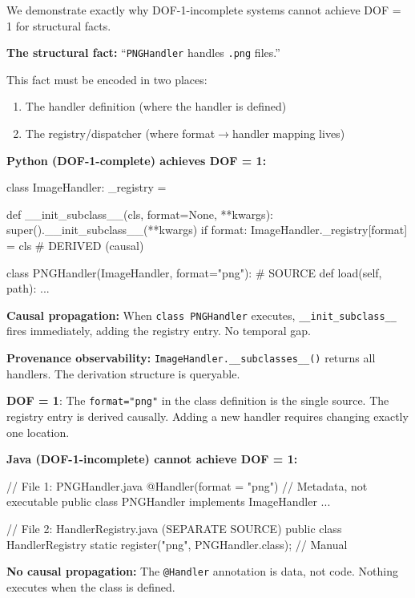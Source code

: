 We demonstrate exactly why DOF-1-incomplete systems cannot achieve DOF = 1 for structural facts.

\textbf{The structural fact:} ``\texttt{PNGHandler} handles \texttt{.png} files.''

This fact must be encoded in two places:
\begin{enumerate}
\tightlist
\item The handler definition (where the handler is defined)
\item The registry/dispatcher (where format$\to$handler mapping lives)
\end{enumerate}

\textbf{Python (DOF-1-complete) achieves DOF = 1:}

\begin{code}
class ImageHandler:
    _registry = {}

    def __init_subclass__(cls, format=None, **kwargs):
        super().__init_subclass__(**kwargs)
        if format:
            ImageHandler._registry[format] = cls  # DERIVED (causal)

class PNGHandler(ImageHandler, format="png"):  # SOURCE
    def load(self, path): ...
\end{code}

\textbf{Causal propagation:} When \texttt{class PNGHandler} executes, \texttt{\_\_init\_subclass\_\_} fires immediately, adding the registry entry. No temporal gap.

\textbf{Provenance observability:} \texttt{ImageHandler.\_\_subclasses\_\_()} returns all handlers. The derivation structure is queryable.

\textbf{DOF = 1}: The \texttt{format="png"} in the class definition is the single source. The registry entry is derived causally. Adding a new handler requires changing exactly one location.

\textbf{Java (DOF-1-incomplete) cannot achieve DOF = 1:}

\begin{code}
// File 1: PNGHandler.java
@Handler(format = "png")  // Metadata, not executable
public class PNGHandler implements ImageHandler { ... }

// File 2: HandlerRegistry.java (SEPARATE SOURCE)
public class HandlerRegistry {
    static { register("png", PNGHandler.class); }  // Manual
}
\end{code}

\textbf{No causal propagation:} The \texttt{@Handler} annotation is data, not code. Nothing executes when the class is defined.

